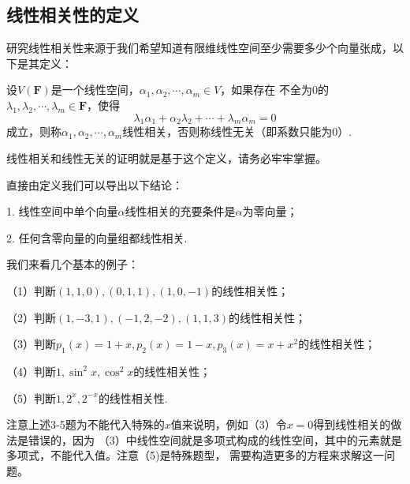 \subsection{线性相关性的定义}
研究线性相关性来源于我们希望知道有限维线性空间至少需要多少个向量张成，以下是其定义：
\begin{definition}
	设$V(\mathbf{F})$是一个线性空间，$\alpha_1,\alpha_2,\cdots,\alpha_m\in V$，如果存在
	不全为$0$的$\lambda_1,\lambda_2,\cdots,\lambda_m\in\mathbf{F}$，使得
	$$\lambda_1\alpha_1+\alpha_2\lambda_2+\cdots+\lambda_m\alpha_m=0$$
	成立，则称$\alpha_1,\alpha_2,\cdots,\alpha_m$线性相关，否则称线性无关（即系数只能为$0$）.
\end{definition}
线性相关和线性无关的证明就是基于这个定义，请务必牢牢掌握。

直接由定义我们可以导出以下结论：

1. 线性空间中单个向量$\alpha$线性相关的充要条件是$\alpha$为零向量；

2. 任何含零向量的向量组都线性相关.

我们来看几个基本的例子：
\begin{example}
	\textup{（1）}判断$(1,1,0),(0,1,1),(1,0,-1)$的线性相关性；

	\textup{（2）}判断$(1,-3,1),(-1,2,-2),(1,1,3)$的线性相关性；

	\textup{（3）}判断$p_1(x)=1+x,p_2(x)=1-x,p_3(x)=x+x^2$的线性相关性；

	\textup{（4）}判断$1,\sin^2x,\cos^2x$的线性相关性；

	\textup{（5）}判断$1,2^x,2^{-x}$的线性相关性.
\end{example}
注意上述3-5题为不能代入特殊的$x$值来说明，例如（3）令$x=0$得到线性相关的做法是错误的，因为
（3）中线性空间就是多项式构成的线性空间，其中的元素就是多项式，不能代入值。注意（5)是特殊题型，
需要构造更多的方程来求解这一问题。
